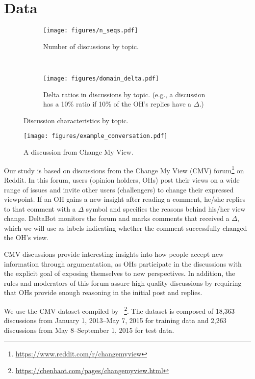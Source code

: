 \documentclass[11pt,a4paper]{article}
\begin{document}
\section{Data\label{sec:data}}

\begin{figure}[t]
	\centering
    \begin{subfigure}[t]{\linewidth}
        \texttt{[image: figures/n\_seqs.pdf]}
\caption{Number of discussions by topic.\label{fig:domain_num}}
    \end{subfigure}\\
    \begin{subfigure}[t]{\linewidth}
        \texttt{[image: figures/domain\_delta.pdf]}
\caption{Delta ratios in discussions by topic. (e.g., a discussion has a 10\% ratio if 10\% of the OH's replies have a $\Delta$.)\label{fig:domain_delta}}
    \end{subfigure}%
    \caption{Discussion characteristics by topic.}
\end{figure}

\begin{figure}[t]
    \centering
	\texttt{[image: figures/example\_conversation.pdf]}
    \caption{A discussion from Change My View.\label{fig:example_conversation}}
\end{figure}


Our study is based on discussions from the Change My View (CMV) forum\footnote{\footnotesize\url{https://www.reddit.com/r/changemyview}} on Reddit. In this forum, users (opinion holders, OHs) post their views on a wide range of issues and invite other users (challengers) to change their expressed viewpoint. If an OH gains a new insight after reading a comment, he/she replies to that comment with a $\Delta$ symbol and specifies the reasons behind his/her view change. DeltaBot monitors the forum and marks comments that received a $\Delta$, which we will use as labels indicating whether the comment successfully changed the OH's view. 

CMV discussions provide interesting insights into how people accept new information through argumentation, as OHs participate in the discussions with the explicit goal of exposing themselves to new perspectives. In addition, the rules and moderators of this forum assure high quality discussions by requiring that OHs provide enough reasoning in the initial post and replies.

We use the CMV dataset compiled by ~\footnote{\footnotesize\url{https://chenhaot.com/pages/changemyview.html}}. The dataset is composed of 18,363 discussions from January 1, 2013--May 7, 2015 for training data and 2,263 discussions from May 8--September 1, 2015 for test data.
\end{document}
